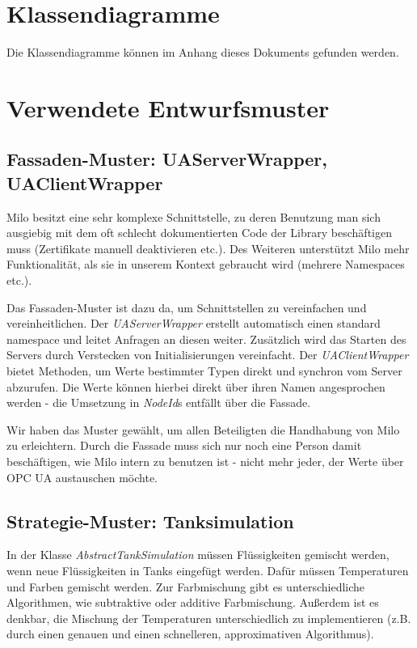 \documentclass[parskip=full]{scrartcl}
\begin{document}
\section{Klassendiagramme}
Die Klassendiagramme können im Anhang dieses Dokuments gefunden werden.

\pagebreak
\section{Verwendete Entwurfsmuster}
\subsection{Fassaden-Muster: UAServerWrapper, UAClientWrapper}
Milo besitzt eine sehr komplexe Schnittstelle, zu deren Benutzung man sich ausgiebig mit dem oft schlecht dokumentierten Code
der Library beschäftigen muss (Zertifikate manuell deaktivieren etc.). Des Weiteren unterstützt Milo mehr Funktionalität,
als sie in unserem Kontext gebraucht wird (mehrere Namespaces etc.).

Das Fassaden-Muster ist dazu da, um Schnittstellen zu vereinfachen und vereinheitlichen.
Der \emph{UAServerWrapper} erstellt automatisch einen standard namespace und leitet Anfragen an
diesen weiter. Zusätzlich wird das Starten des Servers durch Verstecken von Initialisierungen vereinfacht. Der \emph{UAClientWrapper}
bietet Methoden, um Werte bestimmter Typen direkt und synchron vom Server abzurufen. Die Werte können hierbei direkt über ihren
Namen angesprochen werden - die Umsetzung in \emph{NodeId}s entfällt über die Fassade.

Wir haben das Muster gewählt, um allen
Beteiligten die Handhabung von Milo zu erleichtern. Durch die Fassade muss sich nur noch eine Person damit beschäftigen, wie
Milo intern zu benutzen ist - nicht mehr jeder, der Werte über OPC UA austauschen möchte.

\subsection{Strategie-Muster: Tanksimulation}
In der Klasse \emph{AbstractTankSimulation} müssen Flüssigkeiten gemischt werden, wenn neue Flüssigkeiten in Tanks eingefügt werden.
Dafür müssen Temperaturen und Farben gemischt werden. Zur Farbmischung gibt es unterschiedliche Algorithmen, wie subtraktive oder additive
Farbmischung. Außerdem ist es denkbar, die Mischung der Temperaturen unterschiedlich zu implementieren (z.B. durch einen genauen und einen schnelleren,
approximativen Algorithmus).
\end{document}
